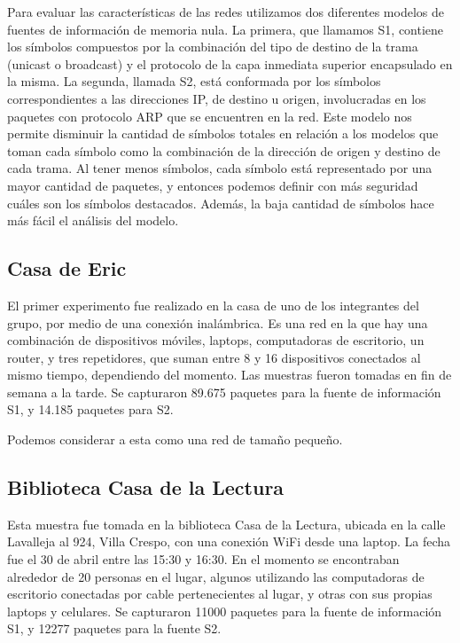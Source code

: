 
Para evaluar las características de las redes utilizamos dos diferentes modelos
de fuentes de información de memoria nula. La primera, que llamamos S1, contiene
los símbolos compuestos por la combinación del tipo de destino de la trama
(unicast o broadcast) y el protocolo de la capa inmediata superior encapsulado
en la misma. La segunda, llamada S2, está conformada por los símbolos 
correspondientes a las direcciones IP, de destino u origen, involucradas en los 
paquetes con protocolo ARP que se encuentren en la red. Este modelo
nos permite disminuir la cantidad de símbolos totales en relación a los
modelos que toman cada símbolo como la combinación de la dirección de 
origen y destino de cada trama. Al tener menos símbolos, cada símbolo
está representado por una mayor cantidad de paquetes, y entonces podemos
definir con más seguridad cuáles son los símbolos destacados. Además,
la baja cantidad de símbolos hace más fácil el análisis del modelo.

\subsection{Casa de Eric}
El primer experimento fue realizado en la casa de uno de los integrantes del grupo, por
medio de una conexión inalámbrica. Es una red en la que hay una combinación de dispositivos
móviles, laptops, computadoras de escritorio, un router, y tres repetidores, 
que suman entre 8 y 16 dispositivos conectados al mismo tiempo, dependiendo del momento.
Las muestras fueron tomadas en fin de semana a la tarde. 
Se capturaron 89.675 paquetes
para la fuente de información S1, y 14.185 paquetes para S2.

Podemos considerar a esta como una red de tamaño pequeño.

\subsection{Biblioteca Casa de la Lectura}
Esta muestra fue tomada en la biblioteca Casa de la Lectura, ubicada en
la calle Lavalleja al 924, Villa Crespo, con una conexión WiFi desde una laptop.
La fecha fue el 30 de abril entre las
15:30 y 16:30. En el momento se encontraban alrededor de 20 personas en el lugar,
algunos utilizando las computadoras de escritorio conectadas por cable
pertenecientes al lugar, y otras con sus propias laptops y celulares. 
Se capturaron 11000 paquetes para la fuente de información S1, 
y 12277 paquetes para la fuente S2.

